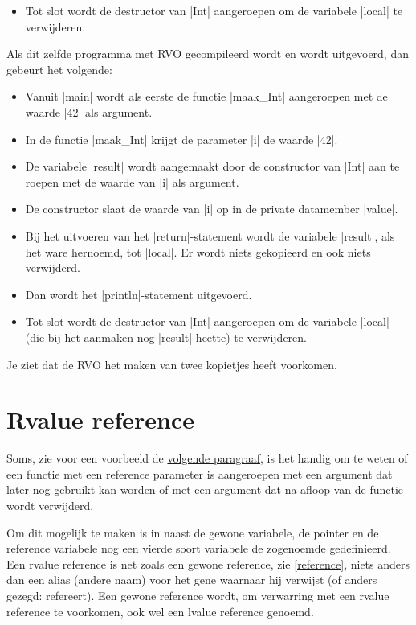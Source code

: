 \begin{cpplstShortInline}
\begin{itemize}
	\item 
	Tot slot wordt de destructor van |Int| aangeroepen om de variabele |local| te verwijderen.
\end{itemize}
Als dit zelfde programma met RVO gecompileerd wordt en wordt uitgevoerd, dan gebeurt het volgende:
\begin{itemize}
	\item 
	Vanuit |main| wordt als eerste de functie |maak_Int| aangeroepen met de waarde |42| als argument. 
	\item 
	In de functie |maak_Int| krijgt de parameter |i| de waarde |42|. 
	\item 
	De variabele |result| wordt aangemaakt door de constructor van |Int| aan te roepen met de waarde van |i| als argument.
	\item 
	De constructor slaat de waarde van |i| op in de private datamember |value|.
	\item 
	Bij het uitvoeren van het |return|\hyp{}statement wordt de variabele |result|, als het ware hernoemd, tot |local|.
	Er wordt niets gekopieerd en ook niets verwijderd.
	\item 
	Dan wordt het |println|\hyp{}statement uitgevoerd.
	\item 
	Tot slot wordt de destructor van |Int| aangeroepen om de variabele |local| (die bij het aanmaken nog |result| heette) te verwijderen.
\end{itemize}
Je ziet dat de RVO het maken van twee kopietjes heeft voorkomen.

\section{Rvalue reference}
\label{sec:rvaluereference}
Soms, zie voor een voorbeeld de \hyperref[sec:move]{volgende paragraaf}, is het handig om te weten of een functie met een reference parameter is aangeroepen met een argument dat later nog gebruikt kan worden of met een argument dat na afloop van de functie wordt verwijderd.

Om dit mogelijk te maken is in \Cpp{} naast de gewone variabele, de pointer en de reference variabele nog een vierde soort variabele de zogenoemde \emph{} gedefinieerd.
Een rvalue reference is net zoals een gewone reference, zie \cref{reference}, niets anders dan een alias (andere naam) voor het gene waarnaar hij verwijst (of anders gezegd: refereert). 
Een gewone reference wordt, om verwarring met een rvalue reference te voorkomen, ook wel een lvalue reference genoemd.


\end{cpplstShortInline}
